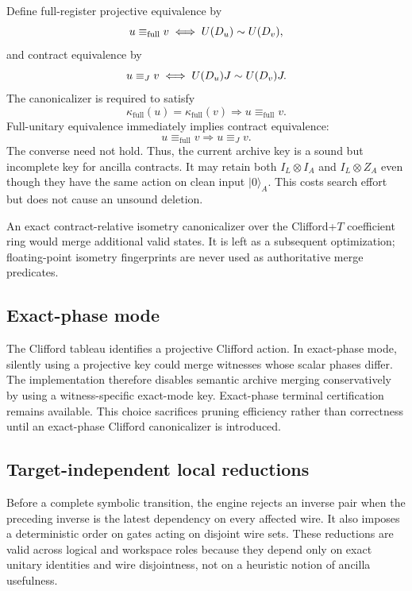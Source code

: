 Define full-register projective equivalence by
\begin{equation}
u\equiv_{\mathrm{full}}v
\iff U(D_u)\mathrel{\sim} U(D_v),
\end{equation}
and contract equivalence by
\begin{equation}
u\equiv_Jv
\iff U(D_u)J\mathrel{\sim} U(D_v)J.
\label{eq:contract-equivalence}
\end{equation}
The canonicalizer is required to satisfy
\begin{equation}
\kappa_{\mathrm{full}}(u)=\kappa_{\mathrm{full}}(v)
\Longrightarrow
u\equiv_{\mathrm{full}}v.
\label{eq:key-soundness}
\end{equation}
Full-unitary equivalence immediately implies contract equivalence:
\begin{equation}
u\equiv_{\mathrm{full}}v
\Longrightarrow u\equiv_Jv.
\label{eq:full-implies-contract}
\end{equation}
The converse need not hold. Thus, the current archive key is a sound but incomplete key for ancilla contracts. It may retain both $I_L\otimes I_A$ and $I_L\otimes Z_A$ even though they have the same action on clean input $\lvert0\rangle_A$. This costs search effort but does not cause an unsound deletion.

An exact contract-relative isometry canonicalizer over the Clifford+$T$ coefficient ring would merge additional valid states. It is left as a subsequent optimization; floating-point isometry fingerprints are never used as authoritative merge predicates.

\subsection{Exact-phase mode}

The Clifford tableau identifies a projective Clifford action. In exact-phase mode, silently using a projective key could merge witnesses whose scalar phases differ. The implementation therefore disables semantic archive merging conservatively by using a witness-specific exact-mode key. Exact-phase terminal certification remains available. This choice sacrifices pruning efficiency rather than correctness until an exact-phase Clifford canonicalizer is introduced.

\subsection{Target-independent local reductions}

Before a complete symbolic transition, the engine rejects an inverse pair when the preceding inverse is the latest dependency on every affected wire. It also imposes a deterministic order on gates acting on disjoint wire sets. These reductions are valid across logical and workspace roles because they depend only on exact unitary identities and wire disjointness, not on a heuristic notion of ancilla usefulness.

